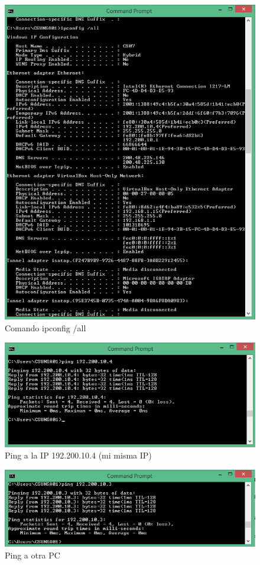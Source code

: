 \documentclass[a4paper,12pt]{article}
\begin{document}
 \begin{figure}[H]
  \centering
  \includegraphics[scale = 0.5]{9.png}
  \caption{Comando ipconfig /all}
 \end{figure}
 
 \begin{figure}[H]
  \centering
  \includegraphics[scale = 0.5]{10.png}
  \caption{Ping a la IP 192.200.10.4 (mi misma IP)}
 \end{figure}
 
 \begin{figure}[H]
  \centering
  \includegraphics[scale = 0.5]{11.png}
  \caption{Ping a otra PC}
 \end{figure}
 
\end{document}
